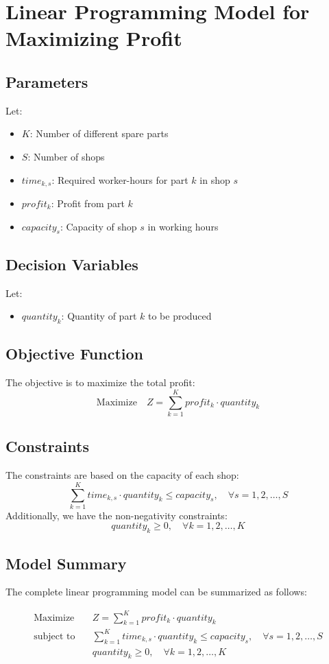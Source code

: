 \documentclass{article}
\begin{document}
\section*{Linear Programming Model for Maximizing Profit}

\subsection*{Parameters}
Let:
\begin{itemize}
    \item $K$: Number of different spare parts
    \item $S$: Number of shops
    \item $time_{k, s}$: Required worker-hours for part $k$ in shop $s$
    \item $profit_{k}$: Profit from part $k$
    \item $capacity_{s}$: Capacity of shop $s$ in working hours
\end{itemize}

\subsection*{Decision Variables}
Let:
\begin{itemize}
    \item $quantity_{k}$: Quantity of part $k$ to be produced
\end{itemize}

\subsection*{Objective Function}
The objective is to maximize the total profit:
\[
\text{Maximize} \quad Z = \sum_{k=1}^{K} profit_{k} \cdot quantity_{k}
\]

\subsection*{Constraints}
The constraints are based on the capacity of each shop:
\[
\sum_{k=1}^{K} time_{k, s} \cdot quantity_{k} \leq capacity_{s}, \quad \forall s = 1, 2, \ldots, S
\]
Additionally, we have the non-negativity constraints:
\[
quantity_{k} \geq 0, \quad \forall k = 1, 2, \ldots, K
\]

\subsection*{Model Summary}
The complete linear programming model can be summarized as follows:

\begin{align*}
\text{Maximize} \quad & Z = \sum_{k=1}^{K} profit_{k} \cdot quantity_{k} \\
\text{subject to} \quad & \sum_{k=1}^{K} time_{k, s} \cdot quantity_{k} \leq capacity_{s}, \quad \forall s = 1, 2, \ldots, S \\
& quantity_{k} \geq 0, \quad \forall k = 1, 2, \ldots, K
\end{align*}
\end{document}
